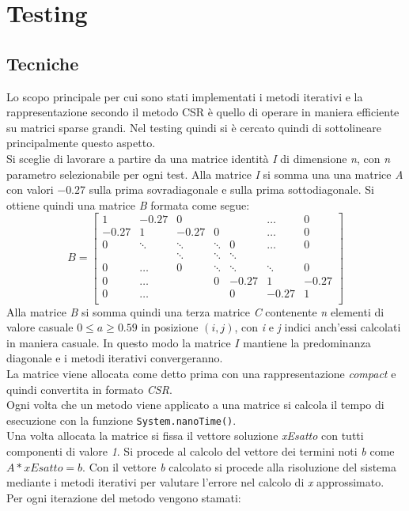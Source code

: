 \documentclass[12pt]{article}
\begin{document}
\section{Testing}
\subsection{Tecniche}
Lo scopo principale per cui sono stati implementati i metodi iterativi e la rappresentazione secondo il metodo CSR è quello di operare in maniera efficiente su matrici sparse grandi. Nel testing quindi si è cercato quindi di sottolineare principalmente questo aspetto.\\Si sceglie di lavorare a partire da una matrice identità \textit{I} di dimensione \textit{n}, con \textit{n} parametro selezionabile per ogni test. Alla matrice \textit{I} si somma una una matrice \textit{A} con valori \(-0.27\) sulla prima sovradiagonale e sulla prima sottodiagonale. Si ottiene quindi una matrice \textit{B} formata come segue:\\
\begin{equation*}
B=
   \left[
        \begin{matrix}
            1 & -0.27 & 0 & & & \dots & 0 \\
            -0.27 & 1 & -0.27 & 0 & & \dots & 0 \\
            0 & \ddots & \ddots & \ddots & 0 & \dots & 0 \\
             & & \ddots & \ddots & \ddots & & \\
            0 & \dots & 0 & \ddots & \ddots & \ddots & 0 \\
            0 & \dots & & 0 & -0.27 & 1 & -0.27 \\
            0 & \dots & & & 0 & -0.27 & 1 \\
        \end{matrix}
    \right]
\end{equation*}
Alla matrice \textit{B} si somma quindi una terza matrice \textit{C} contenente \textit{n} elementi di valore casuale \(0 \leq a \geq 0.59\) in posizione \((i,j)\), con \textit{i} e \textit{j} indici anch'essi calcolati in maniera casuale. In questo modo la matrice \(I\) mantiene la predominanza diagonale e i metodi iterativi convergeranno.\\La matrice viene allocata come detto prima con una rappresentazione \textit{compact} e quindi convertita in formato \textit{CSR}.\\Ogni volta che un metodo viene applicato a una matrice si calcola il tempo di esecuzione con la funzione \texttt{System.nanoTime()}.\\ Una volta allocata la matrice si fissa il vettore soluzione \textit{xEsatto} con tutti componenti di valore \textit{1}. Si procede al calcolo del vettore dei termini noti \textit{b} come \(A*xEsatto = b\). Con il vettore \textit{b} calcolato si procede alla risoluzione del sistema mediante i metodi iterativi per valutare l'errore nel calcolo di \textit{x} approssimato.\\Per ogni iterazione del metodo vengono stamati: 
\end{document}
